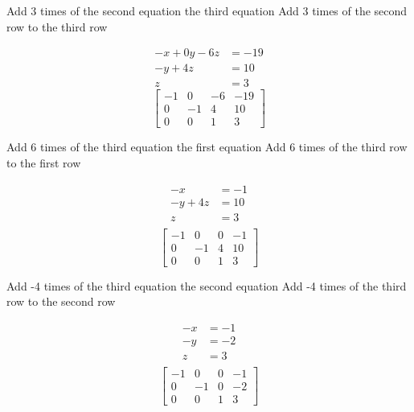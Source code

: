 \documentclass[a4paper, 12pt]{article}
\begin{document}
\begin{multicols}{2} 
Add 3 times of the second equation the third equation
\break
Add 3 times  of the second row to the third row
\end{multicols} 

\begin{multicols}{2}
\begin{align*}
-x +  0y  - 6z &= -19 \\
-y + 4z &= 10 \\
z  &= 3
\end{align*}
\break
\[ \left[ {\begin{array}{cccc}
-1 & 0 & -6 & -19 \\
0 & -1 & 4 & 10 \\
0 & 0 & 1  & 3 
\end{array}} \right] \]
\end{multicols} 

\begin{multicols}{2} 
Add 6 times of the third equation the first equation
\break
Add 6 times of the third row to the first row
\end{multicols} 

\begin{multicols}{2}
\begin{align*}
-x &= -1 \\
-y + 4z &= 10 \\
z  &= 3\\
\end{align*}
\break
\[ \left[ {\begin{array}{cccc}
-1 & 0 & 0  & -1 \\
0 & -1 & 4 & 10 \\
0 & 0 & 1  & 3 
\end{array}} \right] \]
\end{multicols} 

\begin{multicols}{2} 
Add -4 times of the third equation the second equation
\break
Add -4 times of the third row to the second row
\end{multicols}

\begin{multicols}{2}
\begin{align*}
-x &= -1 \\
-y &= -2 \\
z  &= 3\\
\end{align*}
\break
\[ \left[ {\begin{array}{cccc}
-1 & 0 & 0  & -1 \\
0 & -1 & 0 & -2 \\
0 & 0 & 1  & 3 
\end{array}} \right] \]
\end{multicols} 
\end{document}
